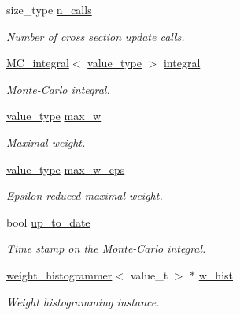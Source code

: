 \begin{DoxyCompactItemize}
\item 
\hypertarget{a00369_a688bd0d0942005e1ccb630a2c71c4935}{}size\+\_\+type \hyperlink{a00369_a688bd0d0942005e1ccb630a2c71c4935}{n\+\_\+calls}\label{a00369_a688bd0d0942005e1ccb630a2c71c4935}

\begin{DoxyCompactList}\small\item\em Number of cross section update calls. \end{DoxyCompactList}\item 
\hypertarget{a00369_a4db4bfcd925daf5ef0a68ba63918cc71}{}\hyperlink{a00368}{M\+C\+\_\+integral}$<$ \hyperlink{a00369_a06caf6de1272e36a9281c3db764e6f16}{value\+\_\+type} $>$ \hyperlink{a00369_a4db4bfcd925daf5ef0a68ba63918cc71}{integral}\label{a00369_a4db4bfcd925daf5ef0a68ba63918cc71}

\begin{DoxyCompactList}\small\item\em Monte-\/\+Carlo integral. \end{DoxyCompactList}\item 
\hypertarget{a00369_a764deecb215e88d579011ebf1b74b031}{}\hyperlink{a00369_a06caf6de1272e36a9281c3db764e6f16}{value\+\_\+type} \hyperlink{a00369_a764deecb215e88d579011ebf1b74b031}{max\+\_\+w}\label{a00369_a764deecb215e88d579011ebf1b74b031}

\begin{DoxyCompactList}\small\item\em Maximal weight. \end{DoxyCompactList}\item 
\hypertarget{a00369_ad92854460f90f7a9623e6c01c4ad5b72}{}\hyperlink{a00369_a06caf6de1272e36a9281c3db764e6f16}{value\+\_\+type} \hyperlink{a00369_ad92854460f90f7a9623e6c01c4ad5b72}{max\+\_\+w\+\_\+eps}\label{a00369_ad92854460f90f7a9623e6c01c4ad5b72}

\begin{DoxyCompactList}\small\item\em Epsilon-\/reduced maximal weight. \end{DoxyCompactList}\item 
\hypertarget{a00369_afff5ddabec476c44242b09b93d2b9822}{}bool \hyperlink{a00369_afff5ddabec476c44242b09b93d2b9822}{up\+\_\+to\+\_\+date}\label{a00369_afff5ddabec476c44242b09b93d2b9822}

\begin{DoxyCompactList}\small\item\em Time stamp on the Monte-\/\+Carlo integral. \end{DoxyCompactList}\item 
\hypertarget{a00369_a442edef087452471004c9e99acc0bda3}{}\hyperlink{a00596}{weight\+\_\+histogrammer}$<$ value\+\_\+t $>$ $\ast$ \hyperlink{a00369_a442edef087452471004c9e99acc0bda3}{w\+\_\+hist}\label{a00369_a442edef087452471004c9e99acc0bda3}

\begin{DoxyCompactList}\small\item\em Weight histogramming instance. \end{DoxyCompactList}\end{DoxyCompactItemize}


